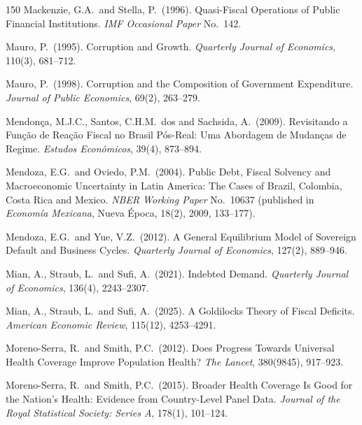 \documentclass[11pt,a4paper]{article}
\begin{document}
\begin{thebibliography}{150}
 Mackenzie, G.A.\ and Stella, P.\ (1996). Quasi-Fiscal Operations of Public Financial Institutions. \textit{IMF Occasional Paper} No.\ 142.

 Mauro, P.\ (1995). Corruption and Growth. \textit{Quarterly Journal of Economics}, 110(3), 681--712.

 Mauro, P.\ (1998). Corruption and the Composition of Government Expenditure. \textit{Journal of Public Economics}, 69(2), 263--279.

 Mendon\c{c}a, M.J.C., Santos, C.H.M.\ dos and Sachsida, A.\ (2009). Revisitando a Fun\c{c}\~ao de Rea\c{c}\~ao Fiscal no Brasil P\'os-Real: Uma Abordagem de Mudan\c{c}as de Regime. \textit{Estudos Econ\^omicos}, 39(4), 873--894.

 Mendoza, E.G.\ and Oviedo, P.M.\ (2004). Public Debt, Fiscal Solvency and Macroeconomic Uncertainty in Latin America: The Cases of Brazil, Colombia, Costa Rica and Mexico. \textit{NBER Working Paper} No.\ 10637 (published in \textit{Econom\'ia Mexicana}, Nueva \'Epoca, 18(2), 2009, 133--177).

 Mendoza, E.G.\ and Yue, V.Z.\ (2012). A General Equilibrium Model of Sovereign Default and Business Cycles. \textit{Quarterly Journal of Economics}, 127(2), 889--946.

 Mian, A., Straub, L.\ and Sufi, A.\ (2021). Indebted Demand. \textit{Quarterly Journal of Economics}, 136(4), 2243--2307.

 Mian, A., Straub, L.\ and Sufi, A.\ (2025). A Goldilocks Theory of Fiscal Deficits. \textit{American Economic Review}, 115(12), 4253--4291.

 Moreno-Serra, R.\ and Smith, P.C.\ (2012). Does Progress Towards Universal Health Coverage Improve Population Health? \textit{The Lancet}, 380(9845), 917--923.

 Moreno-Serra, R.\ and Smith, P.C.\ (2015). Broader Health Coverage Is Good for the Nation's Health: Evidence from Country-Level Panel Data. \textit{Journal of the Royal Statistical Society: Series A}, 178(1), 101--124.


\end{thebibliography}
\end{document}
